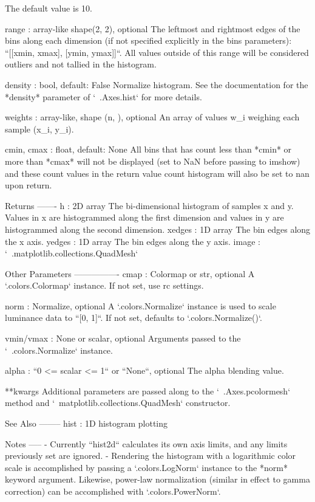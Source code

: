 \begin{DoxyVerb}
\begin{DoxyVerb}
    The default value is 10.

range : array-like shape(2, 2), optional
    The leftmost and rightmost edges of the bins along each dimension
    (if not specified explicitly in the bins parameters): ``[[xmin,
    xmax], [ymin, ymax]]``. All values outside of this range will be
    considered outliers and not tallied in the histogram.

density : bool, default: False
    Normalize histogram.  See the documentation for the *density*
    parameter of `~.Axes.hist` for more details.

weights : array-like, shape (n, ), optional
    An array of values w_i weighing each sample (x_i, y_i).

cmin, cmax : float, default: None
    All bins that has count less than *cmin* or more than *cmax* will
    not be displayed (set to NaN before passing to imshow) and these
    count values in the return value count histogram will also be set
    to nan upon return.

Returns
-------
h : 2D array
    The bi-dimensional histogram of samples x and y. Values in x are
    histogrammed along the first dimension and values in y are
    histogrammed along the second dimension.
xedges : 1D array
    The bin edges along the x axis.
yedges : 1D array
    The bin edges along the y axis.
image : `~.matplotlib.collections.QuadMesh`

Other Parameters
----------------
cmap : Colormap or str, optional
    A `.colors.Colormap` instance.  If not set, use rc settings.

norm : Normalize, optional
    A `.colors.Normalize` instance is used to
    scale luminance data to ``[0, 1]``. If not set, defaults to
    `.colors.Normalize()`.

vmin/vmax : None or scalar, optional
    Arguments passed to the `~.colors.Normalize` instance.

alpha : ``0 <= scalar <= 1`` or ``None``, optional
    The alpha blending value.

**kwargs
    Additional parameters are passed along to the
    `~.Axes.pcolormesh` method and `~matplotlib.collections.QuadMesh`
    constructor.

See Also
--------
hist : 1D histogram plotting

Notes
-----
- Currently ``hist2d`` calculates its own axis limits, and any limits
  previously set are ignored.
- Rendering the histogram with a logarithmic color scale is
  accomplished by passing a `.colors.LogNorm` instance to the *norm*
  keyword argument. Likewise, power-law normalization (similar
  in effect to gamma correction) can be accomplished with
  `.colors.PowerNorm`.
\end{DoxyVerb}
 \mbox{\label{classmatplotlib_1_1axes_1_1__axes_1_1Axes_a83ef8ccb9ff037850f26c0df4b5e1835}} 

\end{DoxyVerb}
